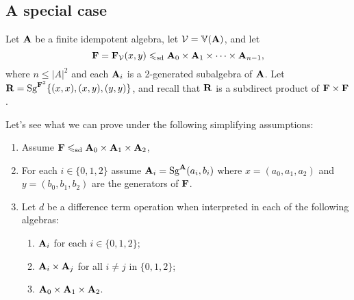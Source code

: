 

\renewcommand\bx{\ensuremath{x}}
\renewcommand\by{\ensuremath{y}}
\subsection{A special case}
Let $\mathbf{A}$ be a finite idempotent algebra, let $\mathcal{V} = \operatorname{\mathbb{V}}(\mathbf{A})$, and let
\[\bF= \bF_{\sV}(\bx,\by) \sdp \bA_0 \times \bA_1 \times \cdots \times \bA_{n-1},\]
where $n \leq |A|^2$ and each $\mathbf{A}_i$ is a 2-generated subalgebra of $\mathbf{A}$.
Let $\bR = \Sg^{\bF^2} \{(\bx, \bx), (\bx, \by), (\by, \by)\}$,
and recall that $\mathbf{R}$ is a subdirect product of $\mathbf{F} \times \mathbf{F}$.

Let's see what we can prove under the following
simplifying assumptions:
\begin{enumerate}
\item Assume $\mathbf{F} \leqslant_{\mathrm{sd}} \mathbf{A}_0 \times \mathbf{A}_1 \times \mathbf{A}_2$,
\item For each $i\in \{0,1,2\}$ assume $\mathbf{A}_i = \operatorname{Sg}^{\mathbf{A}}(a_i, b_i)$ where
  $\bx = (a_0,a_1,a_2)$ and $\by = (b_0,b_1,b_2)$ are the generators of $\mathbf{F}$.
\item Let $d$ be a difference term operation when interpreted in
  each of the following algebras:
\begin{enumerate}
  \item \label{item:13} $\mathbf{A}_i$ for each $i\in \{0,1,2\}$;
  \item \label{item:14}$\mathbf{A}_i\times \mathbf{A}_j$ for all $i \neq j$ in $\{0,1,2\}$;
  \item \label{item:15} $\mathbf{A}_0\times \mathbf{A}_1 \times \mathbf{A}_2$.
\end{enumerate}
\end{enumerate}

